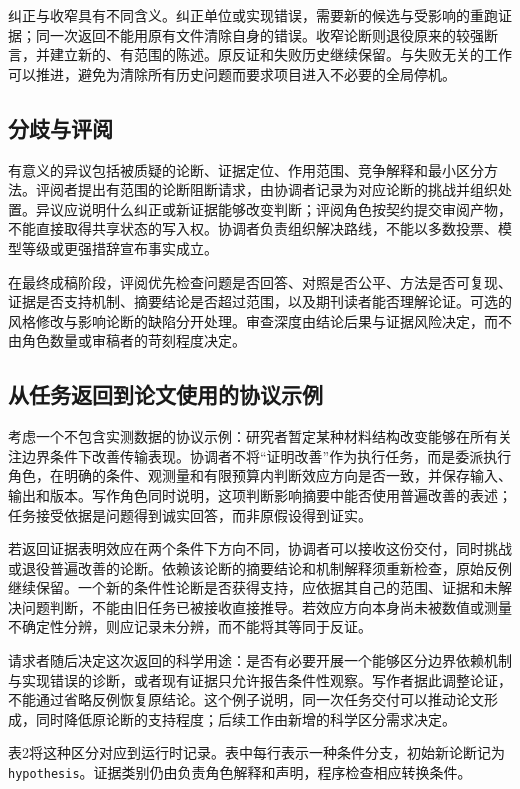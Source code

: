 \documentclass[UTF8,fontset=fandol,a4paper,11pt]{ctexart}
\begin{document}
纠正与收窄具有不同含义。纠正单位或实现错误，需要新的候选与受影响的重跑证据；同一次返回不能用原有文件清除自身的错误。收窄论断则退役原来的较强断言，并建立新的、有范围的陈述。原反证和失败历史继续保留。与失败无关的工作可以推进，避免为清除所有历史问题而要求项目进入不必要的全局停机。

\subsection{分歧与评阅}

有意义的异议包括被质疑的论断、证据定位、作用范围、竞争解释和最小区分方法。评阅者提出有范围的论断阻断请求，由协调者记录为对应论断的挑战并组织处置。异议应说明什么纠正或新证据能够改变判断；评阅角色按契约提交审阅产物，不能直接取得共享状态的写入权。协调者负责组织解决路线，不能以多数投票、模型等级或更强措辞宣布事实成立。

在最终成稿阶段，评阅优先检查问题是否回答、对照是否公平、方法是否可复现、证据是否支持机制、摘要结论是否超过范围，以及期刊读者能否理解论证。可选的风格修改与影响论断的缺陷分开处理。审查深度由结论后果与证据风险决定，而不由角色数量或审稿者的苛刻程度决定。

\subsection{从任务返回到论文使用的协议示例}

考虑一个不包含实测数据的协议示例：研究者暂定某种材料结构改变能够在所有关注边界条件下改善传输表现。协调者不将“证明改善”作为执行任务，而是委派执行角色，在明确的条件、观测量和有限预算内判断效应方向是否一致，并保存输入、输出和版本。写作角色同时说明，这项判断影响摘要中能否使用普遍改善的表述；任务接受依据是问题得到诚实回答，而非原假设得到证实。

若返回证据表明效应在两个条件下方向不同，协调者可以接收这份交付，同时挑战或退役普遍改善的论断。依赖该论断的摘要结论和机制解释须重新检查，原始反例继续保留。一个新的条件性论断是否获得支持，应依据其自己的范围、证据和未解决问题判断，不能由旧任务已被接收直接推导。若效应方向本身尚未被数值或测量不确定性分辨，则应记录未分辨，而不能将其等同于反证。

请求者随后决定这次返回的科学用途：是否有必要开展一个能够区分边界依赖机制与实现错误的诊断，或者现有证据只允许报告条件性观察。写作者据此调整论证，不能通过省略反例恢复原结论。这个例子说明，同一次任务交付可以推动论文形成，同时降低原论断的支持程度；后续工作由新增的科学区分需求决定。

表2将这种区分对应到运行时记录。表中每行表示一种条件分支，初始新论断记为 \texttt{hypothesis}。证据类别仍由负责角色解释和声明，程序检查相应转换条件。
\end{document}
